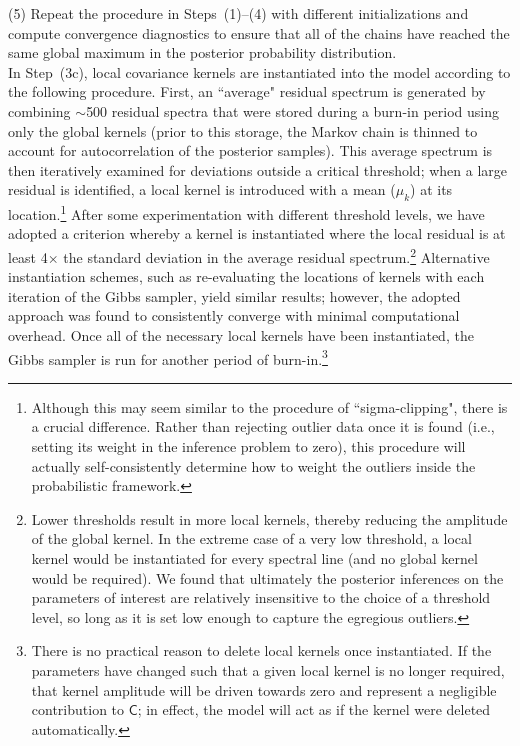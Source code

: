 \documentclass[iop,floatfix,twocolappendix]{emulateapj}
\newcommand{\vC}{\mathsf{C}}
\begin{document}
\noindent (5) Repeat the procedure in Steps~(1)--(4) with different initializations and compute 
convergence diagnostics to ensure that all of the chains have reached the same global maximum in 
the posterior probability distribution. \\

In Step~(3c), local covariance kernels are instantiated into the model according to the following 
procedure.  First, an ``average" residual spectrum is generated by combining $\sim$500 residual 
spectra that were stored during a burn-in period using only the global kernels (prior to this 
storage, the Markov chain is thinned to account for autocorrelation of the posterior samples).  
This average spectrum is then iteratively examined for deviations outside a critical threshold; 
when a large residual is identified, a local kernel is introduced with a mean ($\mu_k$) at its 
location.\footnote{Although this may seem similar to the procedure of ``sigma-clipping", there is a 
crucial difference.  Rather than rejecting outlier data once it is found (i.e., setting its weight 
in the inference problem to zero), this procedure will actually self-consistently determine how to 
weight the outliers inside the probabilistic framework.}  After some experimentation with different 
threshold levels, we have adopted a criterion whereby a kernel is instantiated where the local 
residual is at least 4$\times$ the standard deviation in the average residual 
spectrum.\footnote{Lower thresholds result in more local kernels, thereby reducing the amplitude of 
the global kernel.  In the extreme case of a very low threshold, a local kernel would be 
instantiated for every spectral line (and no global kernel would be required).  We found that 
ultimately the posterior inferences on the parameters of interest are relatively insensitive to the 
choice of a threshold level, so long as it is set low enough to capture the egregious outliers.}  
Alternative instantiation schemes, such as re-evaluating the locations of kernels with each 
iteration of the Gibbs sampler, yield similar results; however, the adopted approach was found to 
consistently converge with minimal computational overhead.  Once all of the necessary local kernels 
have been instantiated, the Gibbs sampler is run for another period of burn-in.\footnote{There is 
no practical reason to delete local kernels once instantiated.  If the parameters have changed such 
that a given local kernel is no longer required, that kernel amplitude will be driven towards zero 
and represent a negligible contribution to $\vC$; in effect, the model will act as if the kernel 
were deleted automatically.}
\end{document}
